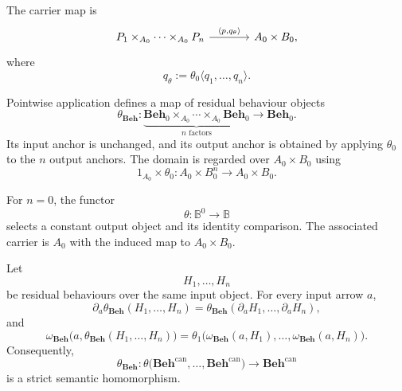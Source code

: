 The carrier map is
\[
\begin{tikzcd}[column sep=large]
    P_1\times_{A_0}\cdots\times_{A_0}P_n
        \arrow[r, "{\langle p,q_\theta\rangle}"]
    &
    A_0\times B_0,
\end{tikzcd}
\]
where
\[
    q_\theta
    :=
    \theta_0\langle q_1,\dots,q_n\rangle.
\]

Pointwise application defines a map of residual behaviour objects
\[
    \theta_{\mathbf{Beh}}:
    \underbrace{
    \mathbf{Beh}_0
    \times_{A_0}\cdots\times_{A_0}
    \mathbf{Beh}_0
    }_{n\text{ factors}}
    \to
    \mathbf{Beh}_0.
\]
Its input anchor is unchanged, and its output anchor is obtained by applying
\(\theta_0\) to the \(n\) output anchors. The domain is regarded over
\(A_0\times B_0\) using
\[
    1_{A_0}\times\theta_0:
    A_0\times B_0^n\to A_0\times B_0.
\]

For \(n=0\), the functor
\[
    \theta:\mathbb B^0\to\mathbb B
\]
selects a constant output object and its identity comparison. The associated
carrier is \(A_0\) with the induced map to \(A_0\times B_0\).

\begin{proposition}
\label{prop:to-pointwise-intertwining}
    Let
    \[
        H_1,\dots,H_n
    \]
    be residual behaviours over the same input object. For every input arrow
    \(a\),
    \[
        \partial_a
        \theta_{\mathbf{Beh}}(H_1,\dots,H_n)
        =
        \theta_{\mathbf{Beh}}
        (\partial_aH_1,\dots,\partial_aH_n),
    \]
    and
    \[
        \omega_{\mathbf{Beh}}
        \bigl(
            a,
            \theta_{\mathbf{Beh}}(H_1,\dots,H_n)
        \bigr)
        =
        \theta_1
        \bigl(
            \omega_{\mathbf{Beh}}(a,H_1),
            \dots,
            \omega_{\mathbf{Beh}}(a,H_n)
        \bigr).
    \]
    Consequently,
    \[
        \theta_{\mathbf{Beh}}:
        \theta
        \bigl(
            \mathbf{Beh}^{\mathrm{can}},
            \dots,
            \mathbf{Beh}^{\mathrm{can}}
        \bigr)
        \to
        \mathbf{Beh}^{\mathrm{can}}
    \]
    is a strict semantic homomorphism.
\end{proposition}

